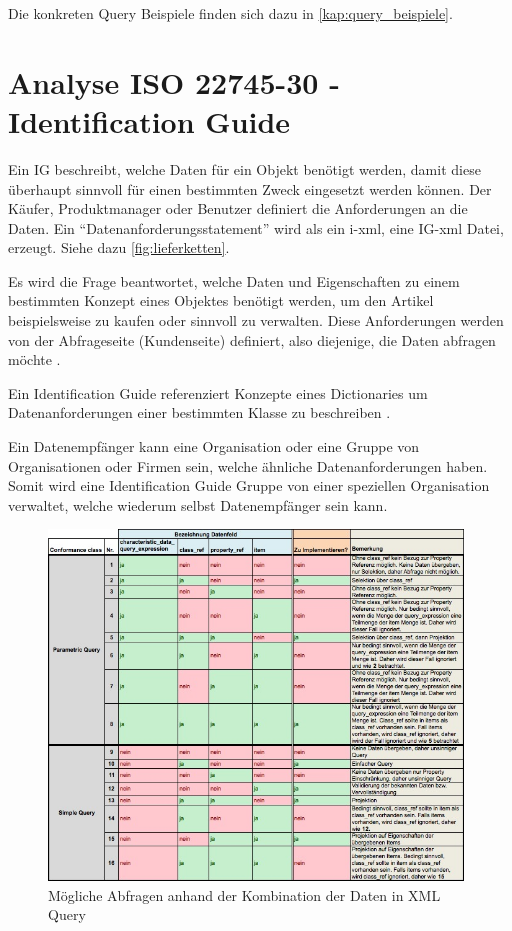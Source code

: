 Die konkreten Query Beispiele finden sich dazu in \autoref{kap:query_beispiele}.

\section{Analyse ISO 22745-30 - Identification Guide}\label{kap:identification_guide}

Ein \gls{IG} beschreibt, welche Daten für ein Objekt benötigt werden, damit diese überhaupt sinnvoll für einen bestimmten Zweck eingesetzt werden können. Der Käufer, Produktmanager oder Benutzer definiert die Anforderungen an die Daten. Ein  \enquote{Datenanforderungsstatement} wird als ein i-xml, eine \gls{IG}-xml Datei, erzeugt. Siehe dazu \autoref{fig:lieferketten}. 

Es wird die Frage beantwortet, welche Daten und Eigenschaften zu einem bestimmten Konzept eines Objektes benötigt werden, um den Artikel beispielsweise zu kaufen oder sinnvoll zu verwalten. Diese Anforderungen werden von der Abfrageseite (Kundenseite) definiert, also diejenige, die Daten abfragen möchte \citep[Vergl.][]{bensonQuality}. 

Ein Identification Guide referenziert Konzepte eines Dictionaries um Datenanforderungen einer bestimmten Klasse zu beschreiben \citep[Vergl.][Kap. 5]{iso22745-30}.

Ein Datenempfänger kann eine Organisation oder eine Gruppe von Organisationen oder Firmen sein, welche ähnliche Datenanforderungen haben. Somit wird eine Identification Guide Gruppe von einer speziellen Organisation verwaltet, welche wiederum selbst Datenempfänger sein kann.  

\begin{figure}[htbp]
	\centering
		\includegraphics[width=0.98\textwidth]{images/queries.jpg}
	\caption{Mögliche Abfragen anhand der Kombination der Daten in XML Query}
	\label{fig:query_kombinationen}
\end{figure}

